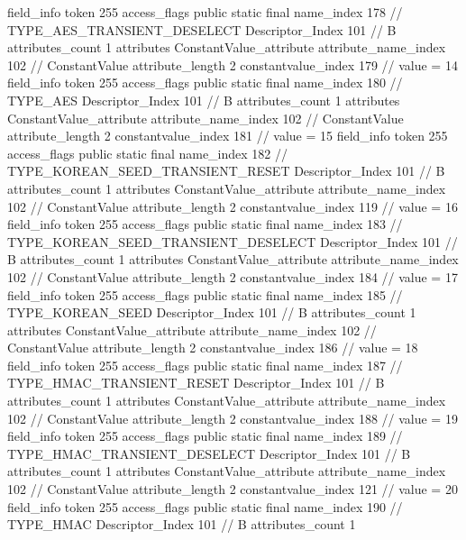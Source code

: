 {{{{{{{				}
				}
			}
			field_info {
				token	255
				access_flags	public static final
				name_index	178		// TYPE_AES_TRANSIENT_DESELECT
				Descriptor_Index	101		// B
				attributes_count	1
				attributes {
				ConstantValue_attribute {
					attribute_name_index	102		// ConstantValue
					attribute_length	2
					constantvalue_index	179		// value = 14
				}
				}
			}
			field_info {
				token	255
				access_flags	public static final
				name_index	180		// TYPE_AES
				Descriptor_Index	101		// B
				attributes_count	1
				attributes {
				ConstantValue_attribute {
					attribute_name_index	102		// ConstantValue
					attribute_length	2
					constantvalue_index	181		// value = 15
				}
				}
			}
			field_info {
				token	255
				access_flags	public static final
				name_index	182		// TYPE_KOREAN_SEED_TRANSIENT_RESET
				Descriptor_Index	101		// B
				attributes_count	1
				attributes {
				ConstantValue_attribute {
					attribute_name_index	102		// ConstantValue
					attribute_length	2
					constantvalue_index	119		// value = 16
				}
				}
			}
			field_info {
				token	255
				access_flags	public static final
				name_index	183		// TYPE_KOREAN_SEED_TRANSIENT_DESELECT
				Descriptor_Index	101		// B
				attributes_count	1
				attributes {
				ConstantValue_attribute {
					attribute_name_index	102		// ConstantValue
					attribute_length	2
					constantvalue_index	184		// value = 17
				}
				}
			}
			field_info {
				token	255
				access_flags	public static final
				name_index	185		// TYPE_KOREAN_SEED
				Descriptor_Index	101		// B
				attributes_count	1
				attributes {
				ConstantValue_attribute {
					attribute_name_index	102		// ConstantValue
					attribute_length	2
					constantvalue_index	186		// value = 18
				}
				}
			}
			field_info {
				token	255
				access_flags	public static final
				name_index	187		// TYPE_HMAC_TRANSIENT_RESET
				Descriptor_Index	101		// B
				attributes_count	1
				attributes {
				ConstantValue_attribute {
					attribute_name_index	102		// ConstantValue
					attribute_length	2
					constantvalue_index	188		// value = 19
				}
				}
			}
			field_info {
				token	255
				access_flags	public static final
				name_index	189		// TYPE_HMAC_TRANSIENT_DESELECT
				Descriptor_Index	101		// B
				attributes_count	1
				attributes {
				ConstantValue_attribute {
					attribute_name_index	102		// ConstantValue
					attribute_length	2
					constantvalue_index	121		// value = 20
				}
				}
			}
			field_info {
				token	255
				access_flags	public static final
				name_index	190		// TYPE_HMAC
				Descriptor_Index	101		// B
				attributes_count	1
}}}}}

